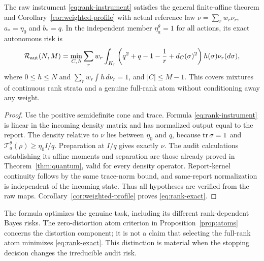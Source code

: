 \begin{proposition}\label{prop:rank}
The raw instrument \eqref{eq:rank-instrument} satisfies the general finite-affine theorem and Corollary~\ref{cor:weighted-profile} with actual reference law $\nu=\sum_rw_r\nu_r$, $a_*=\eta_0$ and $b_*=q$. In the independent member $\eta_a^\theta=1$ for all actions, its exact autonomous risk is
\begin{equation}\label{eq:rank-exact}
 \mathcal R_{\mathrm{aut}}(N,M)
  =\min_{C,\,h}
       \sum_rw_r\int_{K_r}
        \left(q^2+q-1-\frac1r+d_C(\sigma)^2\right)
                          h(\sigma)\nu_r(d\sigma),
\end{equation}
where $0\le h\le N$ and $\sum_rw_r\int h\,d\nu_r=1$, and $|C|\le M-1$. This covers mixtures of continuous rank strata and a genuine full-rank atom without conditioning away any weight.
\end{proposition}
\begin{proof}
Use the positive semidefinite cone and trace. Formula \eqref{eq:rank-instrument} is linear in the incoming density matrix and has normalized output equal to the report. The density relative to $\nu$ lies between $\eta_0$ and $q$, because $\operatorname{tr}\sigma=1$ and $\mathcal T_a^\theta(\rho)\ge\eta_0I/q$. Preparation at $I/q$ gives exactly $\nu$. The audit calculations establishing its affine moments and separation are those already proved in Theorem~\ref{thm:quantum}, valid for every density operator. Report-kernel continuity follows by the same trace-norm bound, and same-report normalization is independent of the incoming state. Thus all hypotheses are verified from the raw maps. Corollary~\ref{cor:weighted-profile} proves \eqref{eq:rank-exact}.
\end{proof}

The formula optimizes the genuine task, including its different rank-dependent Bayes risks. The zero-distortion atom criterion in Proposition~\ref{prop:atoms} concerns the distortion component; it is not a claim that selecting the full-rank atom minimizes \eqref{eq:rank-exact}. This distinction is material when the stopping decision changes the irreducible audit risk.
